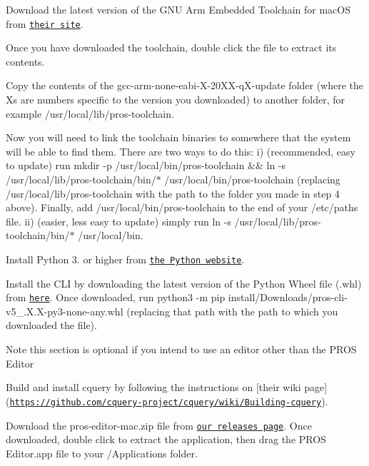\begin{DoxyEnumerate}
\item Download the latest version of the G\+NU Arm Embedded Toolchain for mac\+OS from \href{https://developer.arm.com/open-source/gnu-toolchain/gnu-rm/downloads}{\tt their site}.
\item Once you have downloaded the toolchain, double click the file to extract its contents.
\item Copy the contents of the gcc-\/arm-\/none-\/eabi-\/\+X-\/20\+X\+X-\/q\+X-\/update folder (where the Xs are numbers specific to the version you downloaded) to another folder, for example /usr/local/lib/pros-\/toolchain.
\item Now you will need to link the toolchain binaries to somewhere that the system will be able to find them. There are two ways to do this\+: i) (recommended, easy to update) run {\ttfamily mkdir -\/p /usr/local/bin/pros-\/toolchain \&\& ln -\/s /usr/local/lib/pros-\/toolchain/bin/$\ast$ /usr/local/bin/pros-\/toolchain} (replacing {\ttfamily /usr/local/lib/pros-\/toolchain} with the path to the folder you made in step 4 above). Finally, add {\ttfamily /usr/local/bin/pros-\/toolchain} to the end of your {\ttfamily /etc/paths} file. ii) (easier, less easy to update) simply run {\ttfamily ln -\/s /usr/local/lib/pros-\/toolchain/bin/$\ast$ /usr/local/bin}.
\end{DoxyEnumerate}


\begin{DoxyEnumerate}
\item Install Python 3. or higher from \href{http://python.org}{\tt the Python website}.
\item Install the C\+LI by downloading the latest version of the Python Wheel file (.whl) from \href{https://github.com/purduesigbots/pros-cli3/releases/latest}{\tt here}. Once downloaded, run python3 -\/m pip install/\+Downloads/pros-\/cli-\/v5\+\_.\+X.\+X-\/py3-\/none-\/any.\+whl (replacing that path with the path to which you downloaded the file).
\end{DoxyEnumerate}

\begin{DoxyNote}{Note}
this section is optional if you intend to use an editor other than the P\+R\+OS Editor
\end{DoxyNote}

\begin{DoxyEnumerate}
\item Build and install cquery by following the instructions on \mbox{[}their wiki page\mbox{]}(\href{https://github.com/cquery-project/cquery/wiki/Building-cquery}{\tt https\+://github.\+com/cquery-\/project/cquery/wiki/\+Building-\/cquery}).
\item Download the pros-\/editor-\/mac.\+zip file from \href{https://github.com/purduesigbots/atom/releases/latest}{\tt our releases page}. Once downloaded, double click to extract the application, then drag the P\+R\+OS Editor.\+app file to your /\+Applications folder.
\end{DoxyEnumerate}

